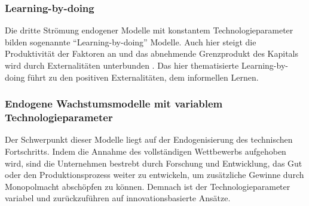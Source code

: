 \subsubsection*{Learning-by-doing}
Die dritte Strömung endogener Modelle mit konstantem Technologieparameter bilden sogenannte "`Learning-by-doing"' Modelle. Auch hier steigt die Produktivität der Faktoren an und das abnehmende Grenzprodukt des Kapitals wird durch Externalitäten unterbunden \cite{Arrow.1962}. Das hier thematisierte Learning-by-doing führt zu den positiven Externalitäten, dem informellen Lernen.
%
\subsubsection{Endogene Wachstumsmodelle mit variablem Technologieparameter}
Der Schwerpunkt dieser Modelle liegt auf der Endogenisierung des technischen Fortschritts. Indem die Annahme des vollständigen Wettbewerbs aufgehoben wird, sind die Unternehmen bestrebt durch Forschung und Entwicklung, das Gut oder den Produktionsprozess weiter zu entwickeln, um zusätzliche Gewinne durch Monopolmacht abschöpfen zu können. Demnach ist der Technologieparameter variabel und zurückzuführen auf innovationsbasierte Ansätze. 
%
